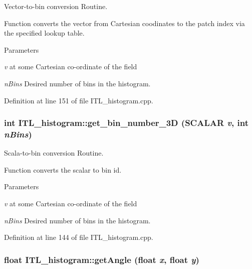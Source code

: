 Vector-\/to-\/bin conversion Routine. 

Function converts the vector from Cartesian coodinates to the patch index via the specified lookup table. 
\begin{DoxyParams}{Parameters}
\item[{\em v}]at some Cartesian co-\/ordinate of the field \item[{\em nBins}]Desired number of bins in the histogram. \end{DoxyParams}


Definition at line 151 of file ITL\_\-histogram.cpp.

\hypertarget{classITL__histogram_a2c91f7397774c26ba629c8e6cb0e9e85}{
\subsubsection[{get\_\-bin\_\-number\_\-3D}]{\setlength{\rightskip}{0pt plus 5cm}int ITL\_\-histogram::get\_\-bin\_\-number\_\-3D ({\bf SCALAR} {\em v}, \/  int {\em nBins})}}
\label{classITL__histogram_a2c91f7397774c26ba629c8e6cb0e9e85}


Scala-\/to-\/bin conversion Routine. 

Function converts the scalar to bin id. 
\begin{DoxyParams}{Parameters}
\item[{\em v}]at some Cartesian co-\/ordinate of the field \item[{\em nBins}]Desired number of bins in the histogram. \end{DoxyParams}


Definition at line 144 of file ITL\_\-histogram.cpp.

\hypertarget{classITL__histogram_a4281e6d3a1b694340308520139c0be93}{
\subsubsection[{getAngle}]{\setlength{\rightskip}{0pt plus 5cm}float ITL\_\-histogram::getAngle (float {\em x}, \/  float {\em y})}}
\label{classITL__histogram_a4281e6d3a1b694340308520139c0be93}


